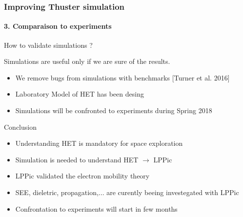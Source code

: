 \documentclass[sans, aspectratio=169]{beamer}
\begin{document}
	

\begin{frame} 
	\frametitle{Improving Thuster simulation} 
	\framesubtitle{3. Comparaison to experiments} 

	\begin{block}{How to validate simulations ?}
	
	Simulations are useful only if we are sure of the results.
	\begin{itemize}
		\item We remove bugs from simulations with benchmarks [Turner et al. 2016]
		\item Laboratory Model of HET has been desing
		\item Simulations will be confronted to experiments during Spring 2018
		
	\end{itemize}		
	
	\end{block}


\end{frame}
\begin{frame}{Conclusion}
	\begin{itemize}
	\item Understanding HET is mandatory for space exploration
	\item Simulation is needed to understand HET $\rightarrow$ LPPic
	\pause
	\vspace{1cm}
	\item LPPic validated the electron mobility theory
	\item SEE, dieletric, propagation,... are curently beeing investegated with LPPic
	\item Confrontation to experiments will start in few months
	\end{itemize}

\end{frame}
\end{document}
